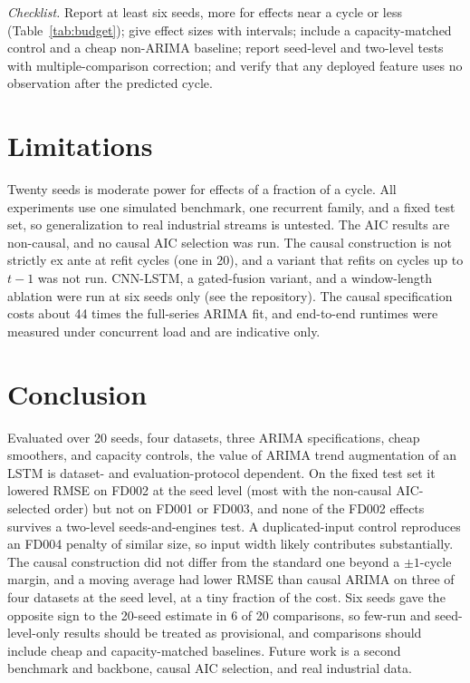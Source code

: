\documentclass[conference]{IEEEtran}
\begin{document}
\emph{Checklist.} Report at least six seeds, more for effects near a cycle or less (Table~\ref{tab:budget}); give effect sizes with intervals; include a capacity-matched control and a cheap non-ARIMA baseline; report seed-level and two-level tests with multiple-comparison correction; and verify that any deployed feature uses no observation after the predicted cycle.

\section{Limitations}
Twenty seeds is moderate power for effects of a fraction of a cycle. All experiments use one simulated benchmark, one recurrent family, and a fixed test set, so generalization to real industrial streams is untested. The AIC results are non-causal, and no causal AIC selection was run. The causal construction is not strictly ex ante at refit cycles (one in 20), and a variant that refits on cycles up to $t-1$ was not run. CNN-LSTM, a gated-fusion variant, and a window-length ablation were run at six seeds only (see the repository). The causal specification costs about 44 times the full-series ARIMA fit, and end-to-end runtimes were measured under concurrent load and are indicative only.

\section{Conclusion}
Evaluated over 20 seeds, four datasets, three ARIMA specifications, cheap smoothers, and capacity controls, the value of ARIMA trend augmentation of an LSTM is dataset- and evaluation-protocol dependent. On the fixed test set it lowered RMSE on FD002 at the seed level (most with the non-causal AIC-selected order) but not on FD001 or FD003, and none of the FD002 effects survives a two-level seeds-and-engines test. A duplicated-input control reproduces an FD004 penalty of similar size, so input width likely contributes substantially. The causal construction did not differ from the standard one beyond a $\pm1$-cycle margin, and a moving average had lower RMSE than causal ARIMA on three of four datasets at the seed level, at a tiny fraction of the cost. Six seeds gave the opposite sign to the 20-seed estimate in 6 of 20 comparisons, so few-run and seed-level-only results should be treated as provisional, and comparisons should include cheap and capacity-matched baselines. Future work is a second benchmark and backbone, causal AIC selection, and real industrial data.
\end{document}
